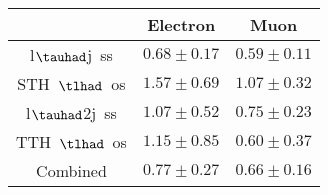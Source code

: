 \centering
\begin{tabular}{|c|c|c|} \hline
 & Electron & Muon\\\hline
l$\tauhad$j~ss & $0.68\pm0.17$ & $0.59\pm0.11$\\\hline
STH~$\tlhad$~os & $1.57\pm0.69$ & $1.07\pm0.32$\\\hline
l$\tauhad$2j~ss & $1.07\pm0.52$ & $0.75\pm0.23$\\\hline
TTH~$\tlhad$~os & $1.15\pm0.85$ & $0.60\pm0.37$\\\hline
Combined & $0.77\pm0.27$ & $0.66\pm0.16$\\\hline
\end{tabular}
